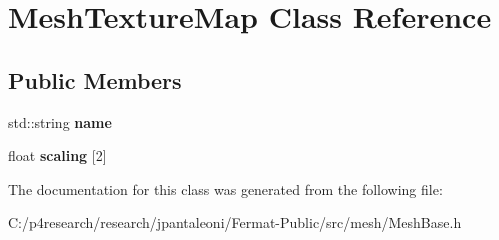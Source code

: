 \hypertarget{class_mesh_texture_map}{}\section{Mesh\+Texture\+Map Class Reference}
\label{class_mesh_texture_map}
\subsection*{Public Members}
\begin{DoxyCompactItemize}
\item 
\mbox{\label{class_mesh_texture_map_aaf61c373083c9b4b1d37f17c548181a4}} 
std\+::string {\bfseries name}
\item 
\mbox{\label{class_mesh_texture_map_a25100a77a6f55956ecabdf7fd4be60da}} 
float {\bfseries scaling} \mbox{[}2\mbox{]}
\end{DoxyCompactItemize}


The documentation for this class was generated from the following file\+:\begin{DoxyCompactItemize}
\item 
C\+:/p4research/research/jpantaleoni/\+Fermat-\/\+Public/src/mesh/Mesh\+Base.\+h\end{DoxyCompactItemize}
